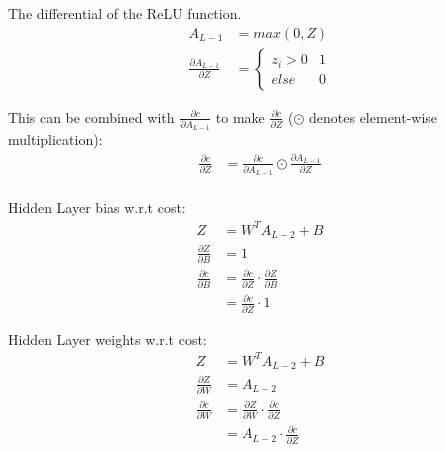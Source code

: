 The differential of the ReLU function.
\begin{equation}
    \begin{aligned}
        A_{L-1} &= max(0,Z)\\[2em]
        \frac{\partial A_{L-1}}{\partial Z} &= 
        \begin{cases}
            z_{i} > 0 & 1 \\
            else & 0
        \end{cases}
    \end{aligned}
\end{equation}

This can be combined with \( \frac{\partial c}{\partial A_{L-1}} \) to make \(
\frac{\partial c}{\partial Z} \) (\( \odot \) denotes element-wise
multiplication):
\begin{equation}
    \begin{aligned}
        \frac{\partial c}{\partial Z} &= \frac{\partial c}{\partial A_{L-1}} \odot \frac{\partial A_{L-1}}{\partial Z}\\
    \end{aligned}
\end{equation}

Hidden Layer bias w.r.t cost:
\begin{equation}
    \begin{aligned}
        Z &= W^{T}A_{L-2} + B\\
        \frac{\partial Z}{\partial B} &= 1\\[2em]
        \frac{\partial c}{\partial B} &= \frac{\partial c}{\partial Z} \cdot \frac{\partial Z}{\partial B}\\
                                      &= \frac{\partial c}{\partial Z} \cdot 1
    \end{aligned}
\end{equation}

Hidden Layer weights w.r.t cost:
\begin{equation}
    \begin{aligned}
        Z &= W^{T}A_{L-2} + B\\
        \frac{\partial Z}{\partial W} &= A_{L-2}\\[2em]
        \frac{\partial c}{\partial W} &= \frac{\partial Z}{\partial W} \cdot \frac{\partial c}{\partial Z}\\
                                      &= A_{L-2} \cdot \frac{\partial c}{\partial Z}
    \end{aligned}
\end{equation}

